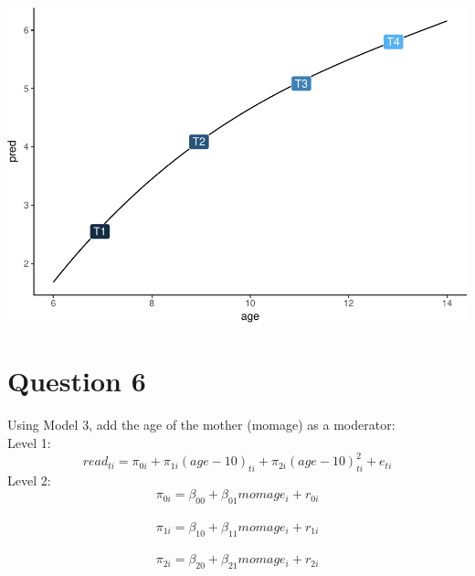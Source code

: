 \documentclass[]{article}
\begin{document}
\includegraphics{Beck_HW_6_files/figure-latex/unnamed-chunk-8-1.pdf}

\section{Question 6}\label{question-6}

Using Model 3, add the age of the mother (momage) as a moderator:\\
Level 1:
\[ read_{ti} = \pi_{0i} + \pi_{1i}(age-10)_{ti} + \pi_{2i}(age-10)^2_{ti} + e_{ti}\]
Level 2: \[ \pi_{0i} = \beta_{00} + \beta_{01}momage_i + r_{0i}\]\\
\[ \pi_{1i} = \beta_{10} + \beta_{11}momage_i + r_{1i}\]\\
\[ \pi_{2i} = \beta_{20} + \beta_{21}momage_i + r_{2i}\]
\end{document}
